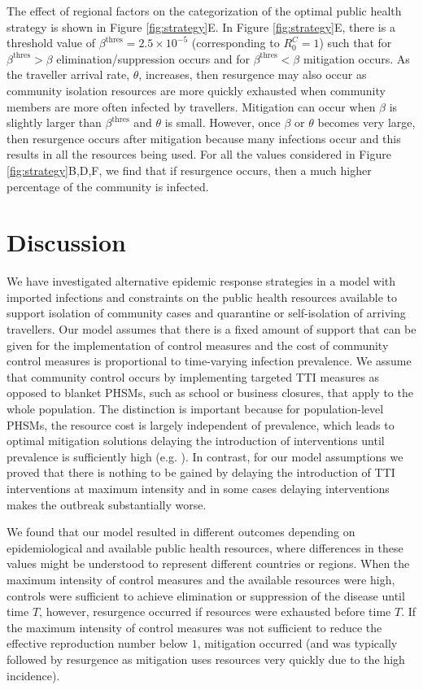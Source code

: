 \documentclass[pdflatex]{sn-jnl}
\theoremstyle{thmstyleone}%
\theoremstyle{thmstyletwo}%
\theoremstyle{thmstylethree}%
\begin{document}
The effect of regional factors on the categorization of the optimal public health strategy is shown in Figure \ref{fig:strategy}E. In Figure \ref{fig:strategy}E, there is a threshold value of $\beta^{\text{thres}} = 2.5 \times 10^{-5}$ (corresponding to $R_0^C=1$) such that for $\beta^{\text{thres}}>\beta$ elimination/suppression occurs and for $\beta^{\text{thres}}<\beta$ mitigation occurs. As the traveller arrival rate, $\theta$, increases, then resurgence may also occur as community isolation resources are more quickly exhausted when community members are more often infected by travellers. Mitigation can occur when $\beta$ is slightly larger than $\beta^{\text{thres}}$ and $\theta$ is small. However, once $\beta$ or $\theta$ becomes very large, then resurgence occurs after mitigation because many infections occur and this results in all the resources being used. For all the values considered in Figure \ref{fig:strategy}B,D,F, we find that if resurgence occurs, then a much higher percentage of the community is infected.

\section{Discussion}\label{sec12}

We have investigated alternative epidemic response strategies in a model with imported infections and constraints on the public health resources available to support isolation of community cases and quarantine or self-isolation of arriving travellers. Our model assumes that there is a fixed amount of support that can be given for the implementation of control measures and the cost of community control measures is proportional to time-varying infection prevalence. We assume that community control occurs by implementing targeted TTI measures as opposed to blanket PHSMs, such as school or business closures, that apply to the whole population. The distinction is important because for population-level PHSMs, the resource cost is largely independent of prevalence, which leads to optimal mitigation solutions delaying the introduction of interventions until prevalence is sufficiently high (e.g. \citealt{britton}). In contrast, for our model assumptions we proved that there is nothing to be gained by delaying the introduction of TTI interventions at maximum intensity and in some cases delaying interventions makes the outbreak substantially worse.  

We found that our model resulted in different outcomes depending on epidemiological and available public health resources, where differences in these values might be understood to represent different countries or regions. When the maximum intensity of control measures and the available resources were high, controls were sufficient to achieve elimination or suppression of the disease until time $T$, however, resurgence occurred if resources were exhausted before time $T$. If the maximum intensity of control measures was not sufficient to reduce the effective reproduction number below $1$, mitigation occurred (and was typically followed by resurgence as mitigation uses resources very quickly due to the high incidence).
\end{document}
